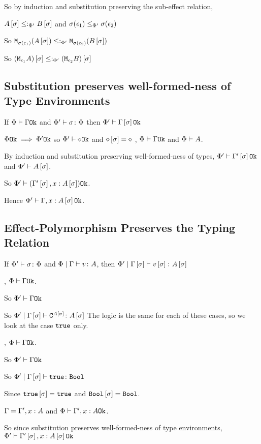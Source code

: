 {So by induction and substitution preserving the sub-effect relation, 

$A\left[\sigma\right]\leq:_{\Phi'} B\left[\sigma\right]$ and $\sigma(\epsilon_1)\leq_{\Phi'}\sigma(\epsilon_2)$

So $\texttt{M}_{\sigma(\epsilon_1)}{(A\left[\sigma\right])} \leq:_{\Phi'}\texttt{M}_{\sigma(\epsilon_2)}{(B\left[\sigma\right])}$

So $(\texttt{M}_{\epsilon_1}{A})\left[\sigma\right] \leq:_{\Phi'}(\texttt{M}_{\epsilon_2}{B})\left[\sigma\right]$


\subsection{Substitution preserves well-formed-ness of Type Environments}

If $\Phi\vdash \Gamma \texttt{Ok}$ and $\Phi' \vdash \sigma \colon \Phi$ then $\Phi'\vdash \Gamma\left[\sigma\right] \texttt{Ok}$

\proof
{}
$\Phi \texttt{Ok}\implies\Phi' \texttt{Ok}$ so $\Phi'\vdash \diamond \texttt{Ok}$
and $\diamond\left[\sigma\right] = \diamond$
\bi, $\Phi\vdash \Gamma \texttt{Ok}$ and $\Phi\vdash A$.

By induction and substitution preserving well-formed-ness of types, $\Phi'\vdash \Gamma'\left[\sigma\right] \texttt{Ok}$ and $\Phi'\vdash A\left[\sigma\right]$.


So $\Phi'\vdash (\Gamma'\left[\sigma\right], x: A\left[\sigma\right]) \texttt{Ok}$.

Hence $\Phi'\vdash \Gamma, x: A\left[\sigma\right] \texttt{Ok}$.

\subsection{Effect-Polymorphism Preserves the Typing Relation}

If $\Phi' \vdash \sigma \colon \Phi$ and $\Phi\mid\Gamma \vdash v \colon A$, then $\Phi'\mid\Gamma\left[\sigma\right] \vdash v\left[\sigma\right] \colon A\left[\sigma\right]$


\proof
{}
\bi, $\Phi\vdash \Gamma \texttt{Ok}$.

So $\Phi'\vdash \Gamma \texttt{Ok}$

So $\Phi'\mid\Gamma\left[\sigma\right] \vdash \texttt{C}^{A\left[\sigma\right]} \colon A\left[\sigma\right]$
The logic is the same for each of these cases, so we look at the case $\texttt{true}$ only.

\bi, $\Phi\vdash \Gamma \texttt{Ok}$.

So $\Phi'\vdash \Gamma \texttt{Ok}$

So $\Phi'\mid\Gamma\left[\sigma\right] \vdash \texttt{true} \colon \texttt{Bool}$

Since $\texttt{true}\left[\sigma\right]=\texttt{true}$ and $\texttt{Bool}\left[\sigma\right]=\texttt{Bool}$.

\bi $\Gamma = \Gamma', x:A$ and $\Phi\vdash \Gamma', x:A \texttt{Ok}$.

So since substitution preserves well-formed-ness of type environments, $\Phi'\vdash \Gamma'\left[\sigma\right], x:A\left[\sigma\right] \texttt{Ok}$

}
